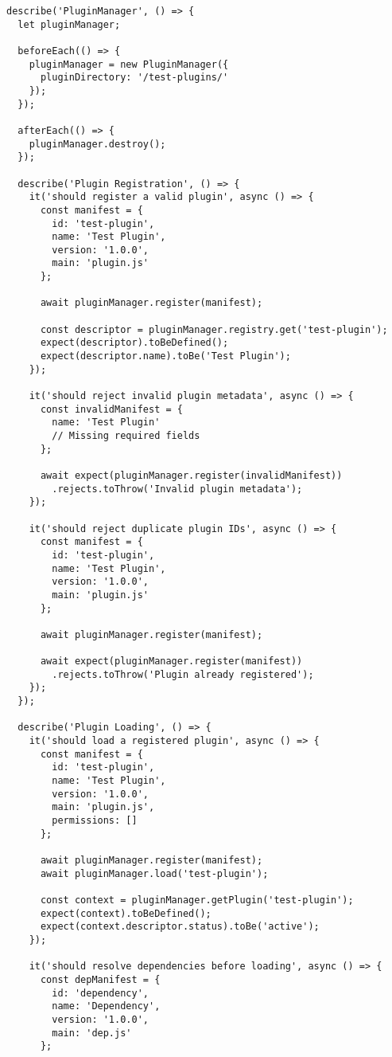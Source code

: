 \documentclass[11pt]{article}
\begin{document}
\begin{verbatim}
describe('PluginManager', () => {
  let pluginManager;
  
  beforeEach(() => {
    pluginManager = new PluginManager({
      pluginDirectory: '/test-plugins/'
    });
  });
  
  afterEach(() => {
    pluginManager.destroy();
  });
  
  describe('Plugin Registration', () => {
    it('should register a valid plugin', async () => {
      const manifest = {
        id: 'test-plugin',
        name: 'Test Plugin',
        version: '1.0.0',
        main: 'plugin.js'
      };
      
      await pluginManager.register(manifest);
      
      const descriptor = pluginManager.registry.get('test-plugin');
      expect(descriptor).toBeDefined();
      expect(descriptor.name).toBe('Test Plugin');
    });
    
    it('should reject invalid plugin metadata', async () => {
      const invalidManifest = {
        name: 'Test Plugin'
        // Missing required fields
      };
      
      await expect(pluginManager.register(invalidManifest))
        .rejects.toThrow('Invalid plugin metadata');
    });
    
    it('should reject duplicate plugin IDs', async () => {
      const manifest = {
        id: 'test-plugin',
        name: 'Test Plugin',
        version: '1.0.0',
        main: 'plugin.js'
      };
      
      await pluginManager.register(manifest);
      
      await expect(pluginManager.register(manifest))
        .rejects.toThrow('Plugin already registered');
    });
  });
  
  describe('Plugin Loading', () => {
    it('should load a registered plugin', async () => {
      const manifest = {
        id: 'test-plugin',
        name: 'Test Plugin',
        version: '1.0.0',
        main: 'plugin.js',
        permissions: []
      };
      
      await pluginManager.register(manifest);
      await pluginManager.load('test-plugin');
      
      const context = pluginManager.getPlugin('test-plugin');
      expect(context).toBeDefined();
      expect(context.descriptor.status).toBe('active');
    });
    
    it('should resolve dependencies before loading', async () => {
      const depManifest = {
        id: 'dependency',
        name: 'Dependency',
        version: '1.0.0',
        main: 'dep.js'
      };
      

\end{verbatim}
\end{document}
